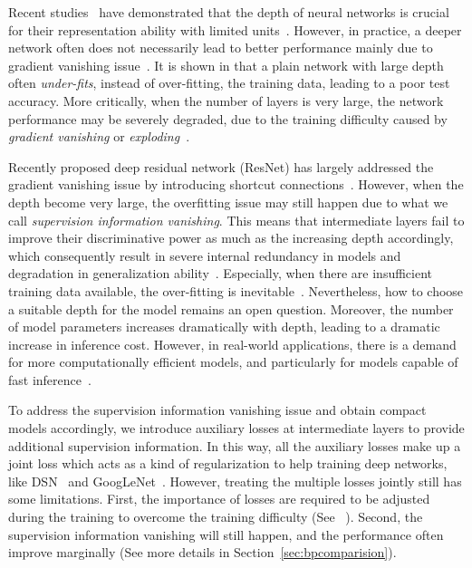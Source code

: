 \documentclass[10pt,onecolumn,letterpaper]{article}
\begin{document}
Recent studies~\cite{simonyan2014very,srivastava2015training,szegedy2015going,Lee2015} have demonstrated that the depth of neural networks is crucial for their representation ability with limited units~\cite{srivastava2015training}.
However,  in practice, a deeper network often does not necessarily lead to better performance mainly due to gradient vanishing issue~\cite{glorot2010understanding,romero2014fitnets,srivastava2015highway,he2015deep}.
It is shown in \cite{he2015deep} that a plain network with large depth  often {\em under-fits}, instead of over-fitting, the training data, leading to a poor test accuracy.
More critically,  when the number of layers is very large, the network performance  may be severely degraded, due to the training difficulty caused by \emph{gradient vanishing} or \emph{exploding}~\cite{glorot2010understanding,romero2014fitnets,srivastava2015highway,he2015deep}.

Recently proposed deep residual network (ResNet) has largely addressed the gradient vanishing issue by introducing shortcut connections~\cite{he2015deep}. However, when the depth become very large, the overfitting issue may still happen due to what we call \emph{supervision information
vanishing}. This means that intermediate layers fail to improve their discriminative power as much as the increasing depth accordingly, which consequently result in severe internal redundancy in models and degradation in generalization ability~\cite{he2015deep,DBLP:journals/corr/HuangSLSW16}.
Especially, when there are insufficient training data available, the over-fitting is inevitable~\cite{he2015deep}. Nevertheless, how to choose a suitable depth for the model remains an open question. Moreover, the number of model parameters increases dramatically  with depth, leading to a dramatic increase in inference cost. However, in real-world applications, there is a demand for more computationally efficient models, and particularly for models capable of fast inference~\cite{ba2014deep}.

To address the supervision information vanishing issue and obtain compact models accordingly, we introduce auxiliary losses at intermediate layers to provide additional supervision information. In this way, all the auxiliary losses make up a joint loss which acts as a kind of regularization to help training deep networks, like DSN~\cite{Lee2015} and GoogLeNet~\cite{szegedy2015going}. However, treating the multiple losses jointly still has some limitations. First, the importance of losses are required to be adjusted during the training to overcome the training difficulty (See ~\cite{Lee2015}).  Second, the supervision information vanishing will still happen, and the performance often improve marginally  (See more details in Section~\ref{sec:bpcomparision}).
\end{document}
